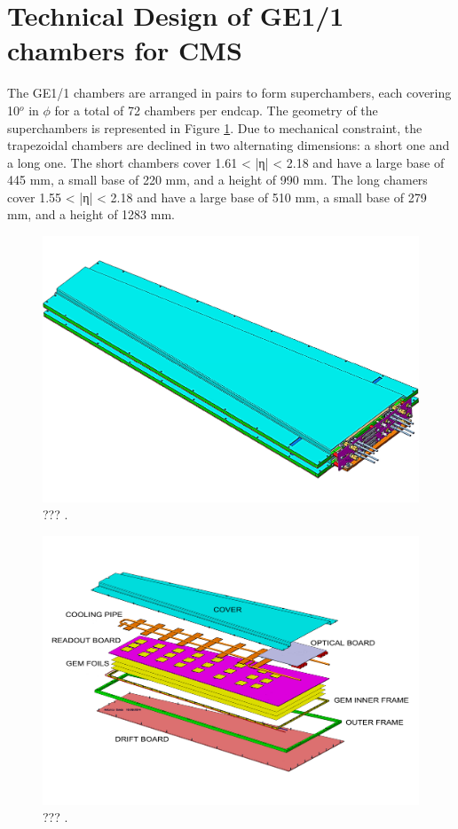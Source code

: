   \section{Technical Design of GE1/1 chambers for CMS}

    The GE1/1 chambers are arranged in pairs to form superchambers, each covering 10$^o$ in $ \phi $ for a total of 72 chambers per endcap. The geometry of the superchambers is represented in Figure \ref{fig:II-1-gem-superchamber}. Due to mechanical constraint, the trapezoidal chambers are declined in two alternating dimensions: a short one and a long one. The short chambers cover 1.61 < |η| < 2.18 and have a large base of 445 mm, a small base of 220 mm, and a height of 990 mm. The long chamers cover 1.55 < |η| < 2.18 and have a large base of 510 mm, a small base of 279 mm, and a height of 1283 mm. \\

    \begin{figure}[h!]
      \centering
      \includegraphics[width=\textwidth]{img/II-1-gem/superchamber.pdf}
      \caption{??? \cite{Colaleo:2021453}.}
      \label{fig:II-1-gem-superchamber}
    \end{figure}

    \begin{figure}[h!]
      \centering
      \includegraphics[width=\textwidth]{img/II-1-gem/gem-exploded.pdf}
      \caption{??? \cite{Colaleo:2021453}.}
      \label{fig:II-1-gem-exploded}
    \end{figure}

